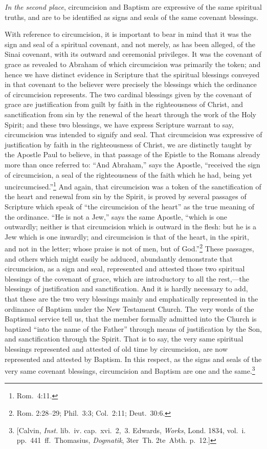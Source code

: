 \documentclass[
  english,
]{book}
\newcommand{\textgerman}[2][]{\foreignlanguage{ngerman}{#2}}
\begin{document}
\emph{In the second place}, circumcision and Baptism are expressive of the same spiritual truths, and are to be identified as signs and seals of the same covenant blessings.

With reference to circumcision, it is important to bear in mind that it was the sign and seal of a spiritual covenant, and not merely, as has been alleged, of the Sinai covenant, with its outward and ceremonial privileges. It was the covenant of grace as revealed to Abraham of which circumcision was primarily the token; and hence we have distinct evidence in Scripture that the spiritual blessings conveyed in that covenant to the believer were precisely the blessings which the ordinance of circumcision represents. The two cardinal blessings given by the covenant of grace are justification from guilt by faith in the righteousness of Christ, and sanctification from sin by the renewal of the heart through the work of the Holy Spirit; and these two blessings, we have express Scripture warrant to say, circumcision was intended to signify and seal. That circumcision was expressive of justification by faith in the righteousness of Christ, we are distinctly taught by the Apostle Paul to believe, in that passage of the Epistle to the Romans already more than once referred to: ``And Abraham,'' says the Apostle, ``received the sign of circumcision, a seal of the righteousness of the faith which he had, being yet uncircumcised.''\footnote{Rom.~4:11.} And again, that circumcision was a token of the sanctification of the heart and renewal from sin by the Spirit, is proved by several passages of Scripture which speak of ``the circumcision of the heart'' as the true meaning of the ordinance. ``He is not a Jew,'' says the same Apostle, ``which is one outwardly; neither is that circumcision which is outward in the flesh: but he is a Jew which is one inwardly; and circumcision is that of the heart, in the spirit, and not in the letter; whose praise is not of men, but of God.''\footnote{Rom. 2:28--29; Phil.~3:3; Col.~2:11; Deut.~30:6.} These passages, and others which might easily be adduced, abundantly demonstrate that circumcision, as a sign and seal, represented and attested those two spiritual blessings of the covenant of grace, which are introductory to all the rest,---the blessings of justification and sanctification. And it is hardly necessary to add, that these are the two very blessings mainly and emphatically represented in the ordinance of Baptism under the New Testament Church. The very words of the Baptismal service tell us, that the member formally admitted into the Church is baptized ``into the name of the Father'' through means of justification by the Son, and sanctification through the Spirit. That is to say, the very same spiritual blessings represented and attested of old time by circumcision, are now represented and attested by Baptism. In this respect, as the signs and seals of the very same covenant blessings, circumcision and Baptism are one and the same.\footnote{{[}Calvin, \emph{Inst.} lib.~iv. cap.~xvi.~2,~3. Edwards, \emph{Works}, Lond. 1834, vol.~i. pp.~441~ff.~Thomasius, \textgerman{\emph{Dogmatik}, 3ter~Th. 2te~Abth.} p.~12.{]}}
\end{document}
